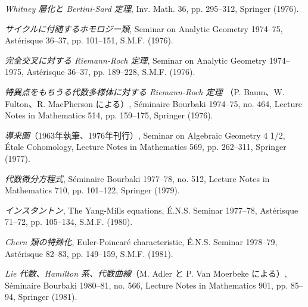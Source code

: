 \clearpage
{}
\small
\begin{description}
\item[{[24]}] \emph{Whitney 層化と Bertini-Sard 定理}, Inv. Math. 36,
pp. 295--312, Springer (1976).

\item[{[25]}] \emph{サイクルに付随するホモロジー類}, Seminar on
Analytic Geometry 1974--75, Astérisque 36--37, pp. 101--151,
S.M.F. (1976).

\item[{[26]}] \emph{完全交叉に対する Riemann-Roch 定理}, Seminar on
Analytic Geometry 1974--1975, Astérisque 36--37, pp. 189--228,
S.M.F. (1976).

\item[{[27]}] \emph{特異点をもちうる代数多様体に対する Riemann-Roch 定理}
（P. Baum、W. Fulton、R. MacPherson による）, Séminaire Bourbaki
1974--75, no. 464, Lecture Notes in Mathematics 514, pp. 159--175,
Springer (1976).

\item[{[28]}] \emph{導来圏}（1963年執筆、1976年刊行）, Seminar on
Algebraic Geometry 4 1/2, Étale Cohomology, Lecture Notes in Mathematics
569, pp. 262--311, Springer (1977).

\item[{[29]}] \emph{代数微分方程式}, Séminaire Bourbaki 1977--78,
no. 512, Lecture Notes in Mathematics 710, pp. 101--122, Springer (1979).

\item[{[30]}] \emph{インスタントン}, The Yang-Mills equations,
É.N.S. Seminar 1977--78, Astérisque 71--72, pp. 105--134, S.M.F. (1980).

\item[{[31]}] \emph{Chern 類の特殊化}, Euler-Poincaré characteristic,
É.N.S. Seminar 1978--79, Astérisque 82--83, pp. 149--159, S.M.F. (1981).

\item[{[32]}] \emph{Lie 代数、Hamilton 系、代数曲線}（M. Adler と
P. Van Moerbeke による）, Séminaire Bourbaki 1980--81, no. 566,
Lecture Notes in Mathematics 901, pp. 85--94, Springer (1981).


\end{description}
